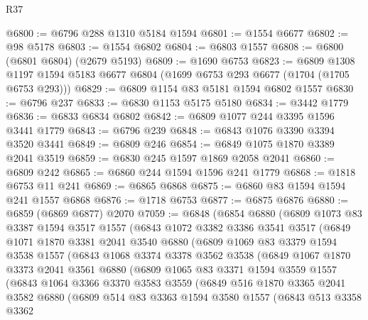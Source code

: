 \begin{lexlean}{R37}
\begin{coremodule}
@6800 := @6796 @288 @1310 @5184 @1594
@6801 := @1554 @6677
@6802 := @98 @5178
@6803 := @1554 @6802
@6804 := @6803 @1557
@6808 := @6800 (@6801 @6804) (@2679 @5193)
@6809 := @1690 @6753
@6823 := @6809
    @1308
    @1197
    @1594
    @5183
    @6677
    @6804
    (@1699 @6753 @293 @6677 (@1704 (@1705 @6753 @293)))
@6829 := @6809 @1154 @83 @5181 @1594 @6802 @1557
@6830 := @6796 @237
@6833 := @6830 @1153 @5175 @5180
@6834 := @3442 @1779
@6836 := @6833 @6834 @6802
@6842 := @6809 @1077 @244 @3395 @1596 @3441 @1779
@6843 := @6796 @239
@6848 := @6843 @1076 @3390 @3394 @3520 @3441
@6849 := @6809 @246
@6854 := @6849 @1075 @1870 @3389 @2041 @3519
@6859 := @6830 @245 @1597 @1869 @2058 @2041
@6860 := @6809 @242
@6865 := @6860 @244 @1594 @1596 @241 @1779
@6868 := @1818 @6753 @11 @241
@6869 := @6865 @6868
@6875 := @6860 @83 @1594 @1594 @241 @1557 @6868
@6876 := @1718 @6753
@6877 := @6875 @6876
@6880 := @6859 (@6869 @6877) @2070
@7059 := @6848
    (@6854
      @6880
      (@6809
        @1073
        @83
        @3387
        @1594
        @3517
        @1557
        (@6843
          @1072
          @3382
          @3386
          @3541
          @3517
          (@6849
            @1071
            @1870
            @3381
            @2041
            @3540
            @6880
            (@6809
              @1069
              @83
              @3379
              @1594
              @3538
              @1557
              (@6843
                @1068
                @3374
                @3378
                @3562
                @3538
                (@6849
                  @1067
                  @1870
                  @3373
                  @2041
                  @3561
                  @6880
                  (@6809
                    @1065
                    @83
                    @3371
                    @1594
                    @3559
                    @1557
                    (@6843
                      @1064
                      @3366
                      @3370
                      @3583
                      @3559
                      (@6849
                        @516
                        @1870
                        @3365
                        @2041
                        @3582
                        @6880
                        (@6809
                          @514
                          @83
                          @3363
                          @1594
                          @3580
                          @1557
                          (@6843
                            @513
                            @3358
                            @3362

\end{coremodule}
\end{lexlean}
